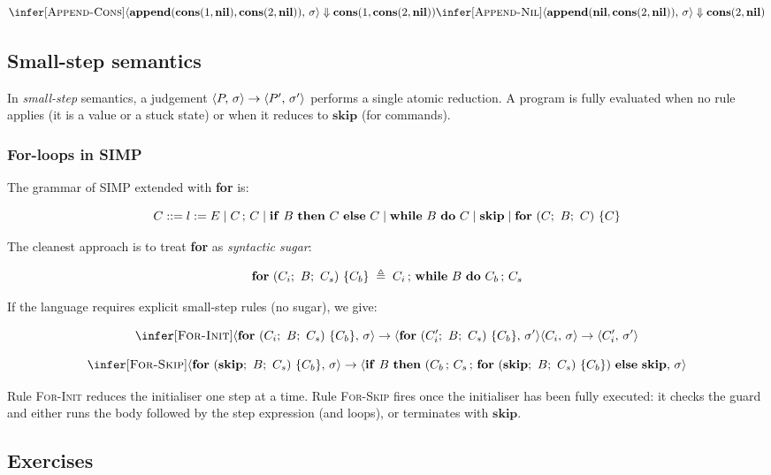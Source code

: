 \[
\infer[\textsc{Append-Cons}]
  {\bigstep{\append{\cons{1}{\nil}}{\cons{2}{\nil}}}{\sigma}{\cons{1}{\cons{2}{\nil}}}}
  {
    \infer[\textsc{Append-Nil}]
      {\bigstep{\append{\nil}{\cons{2}{\nil}}}{\sigma}{\cons{2}{\nil}}}
      {}
  }
\]
\subsection{Small-step semantics}

In \emph{small-step} semantics, a judgement
$\langle P,\, \sigma \rangle \rightarrow \langle P',\, \sigma' \rangle$ performs a single atomic reduction.
A program is fully evaluated when no rule applies (it is a value or a
stuck state) or when it reduces to $\mathbf{skip}$ (for commands).

\subsubsection{For-loops in SIMP}

The grammar of SIMP extended with \textbf{for} is:

\[
C ::= l := E \mid C \,;\, C \mid \mathbf{if}\ B\ \mathbf{then}\ C\ \mathbf{else}\ C \mid
      \mathbf{while}\ B\ \mathbf{do}\ C \mid \mathbf{skip} \mid \mathbf{for}\ (C;\ B;\ C)\ \{C\}
\]

The cleanest approach is to treat \textbf{for} as \emph{syntactic sugar}:

\[
\mathbf{for}\ (C_i;\ B;\ C_s)\ \{C_b\}
\;\triangleq\;
C_i \,;\, \mathbf{while}\ B\ \mathbf{do}\ C_b \,;\, C_s
\]

If the language requires explicit small-step rules (no sugar), we give:

\[
\infer[\textsc{For-Init}]
  {\steppair{\fordoo{C_i}{B}{C_s}{C_b}}{\sigma}
            {\fordoo{C_i'}{B}{C_s}{C_b}}{\sigma'}}
  {\steppair{C_i}{\sigma}{C_i'}{\sigma'}}
\]

\[
\infer[\textsc{For-Skip}]
  {\steppair{\fordoo{\mathbf{skip}}{B}{C_s}{C_b}}{\sigma}
            {\ift{B}{(\seq{C_b}{\seq{C_s}{\fordoo{\mathbf{skip}}{B}{C_s}{C_b}}})}{{\mathbf{skip}}}}{\sigma}}
  {}
\]

Rule \textsc{For-Init} reduces the initialiser one step at a time.
Rule \textsc{For-Skip} fires once the initialiser has been fully executed:
it checks the guard and either runs the body followed by the step expression
(and loops), or terminates with $\mathbf{skip}$.

\subsection{Exercises}

